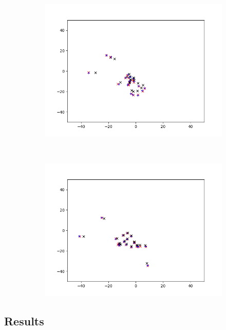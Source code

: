 \begin{figure}[h] %
\centering
\begin{subfigure}[t]{0.45\textwidth}
\centering
\includegraphics[width=\textwidth]{Figs/layers-136-161}
\caption{} 
\label{fig:2a} 
\end{subfigure}
~
\begin{subfigure}[t]{0.45\textwidth}
\includegraphics[width=\textwidth]{Figs/layers-686-736}
\caption{} 
\label{fig:2b}
\end{subfigure}
\end{figure}


\subsection{Results}

